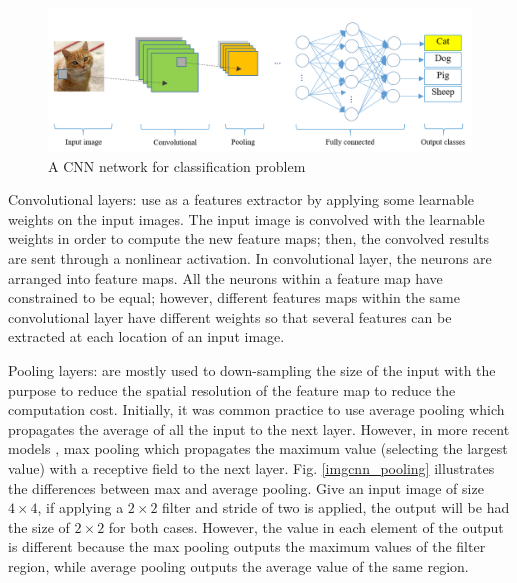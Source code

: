 \documentclass[review]{elsarticle}
\begin{document}
\begin{figure}[!h]
	\centering
	\includegraphics[scale=.5]{images/cnn_network}
	\caption{A CNN network for classification problem}
	\label{imgcnn_network}
\end{figure}

Convolutional layers: use as a features extractor by applying some learnable weights on the input images. The input image is convolved with the learnable weights in order to compute the new feature maps; then, the convolved results are sent through a nonlinear activation. In convolutional layer, the neurons are arranged into feature maps. All the neurons within a feature map have constrained to be equal; however, different features maps within the same convolutional layer have different weights so that several features can be extracted at each location of an input image. 

Pooling layers: are mostly used to down-sampling the size of the input with the purpose to reduce the spatial resolution of the feature map to reduce the computation cost. Initially, it was common practice to use average pooling which propagates the average of all the input to the next layer. However, in more recent models \cite{krizhevsky2012imagenet, ciregan2012multi, li2015convolutional}, max pooling which propagates the maximum value (selecting the largest value) with a receptive field to the next layer. Fig. \ref{imgcnn_pooling} illustrates the differences between max and average pooling. Give an input image of size $4 \times 4$, if applying a $2 \times 2$ filter and stride of two is applied, the output will be had the size of $2 \times 2$ for both cases. However, the value in each element of the output is different because the max pooling outputs the maximum values of the filter region, while average pooling outputs the average value of the same region.
\end{document}
